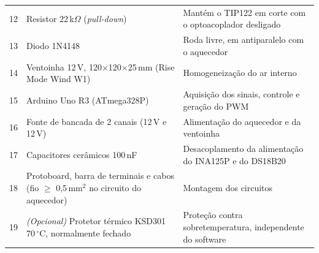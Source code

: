 \begin{table}[H]
\begin{tabularx}{\textwidth}{C{0.6cm} L L}
12 & Resistor 22\,k$\Omega$ (\textit{pull-down}) & Mantém o TIP122 em corte com o optoacoplador desligado \\
13 & Diodo 1N4148 & Roda livre, em antiparalelo com o aquecedor \\
14 & Ventoinha 12\,V, 120$\times$120$\times$25\,mm (Rise Mode Wind W1) & Homogeneização do ar interno \\
15 & Arduino Uno R3 (ATmega328P) & Aquisição dos sinais, controle e geração do PWM \\
16 & Fonte de bancada de 2 canais (12\,V e 12\,V) & Alimentação do aquecedor e da ventoinha \\
17 & Capacitores cerâmicos 100\,nF & Desacoplamento da alimentação do INA125P e do DS18B20 \\
18 & Protoboard, barra de terminais e cabos (fio $\geq$ 0,5\,mm$^2$ no circuito do aquecedor) & Montagem dos circuitos \\
19 & \textit{(Opcional)} Protetor térmico KSD301 70\,\ensuremath{^\circ}C, normalmente fechado & Proteção contra sobretemperatura, independente do software \\
\bottomrule
\end{tabularx}
\end{table}
